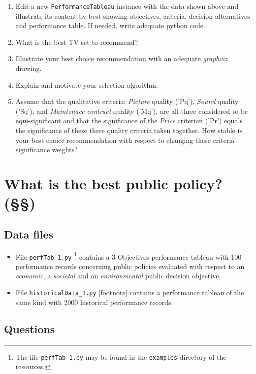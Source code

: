 \begin{enumerate}
\item Edit a new \texttt{PerformanceTableau} instance with the data shown above and illustrate its content by best showing objectives, criteria, decision alternatives and performance table. If needed, write adequate python code.
\item What is the best TV set to recommend?
\item Illustrate your best choice recommendation with an adequate \emph{graphviz} drawing.
\item Explain and motivate your selection algorithm.
\item Assume that the qualitative criteria: \emph{Picture} quality ('Pq'), \emph{Sound} quality ('Sq'), and \emph{Maintenace contract} quality ('Mq'), are all three considered to be equi-significant and that the significance of the \emph{Price} criterion ('Pr') equals the significance of these three quality criteria taken together. How stable is your best choice recommendation with respect to changing these criteria significance weights?
\end{enumerate}   

\section{What is the best public policy? (§§)}
\label{sec:15.4}

\subsection{Data files}
\label{sec:15.4.1}

\begin{itemize}
\item File \texttt{perfTab\_1.py} \footnote{The file \texttt{perfTab\_1.py} may be found in the \texttt{examples} directory of the \Digraph resources.} contains a 3 Objectives performance tableau with 100 performance records concerning public policies evaluated with respect to an \emph{economic}, a \emph{societal} and an \emph{environmental} public decision objective.
\item File \texttt{historicalData\_1.py} [footnote] contains a performance tableau of the same kind with 2000 historical performance records.
\end{itemize}

\subsection{Questions}
\label{sec:15.4.2}

